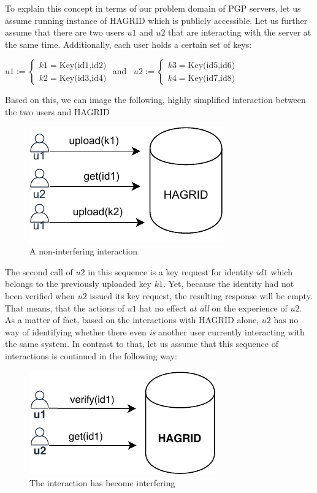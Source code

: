 To explain this concept in terms of our problem domain of PGP servers, let us assume running instance of HAGRID which is publicly accessible. Let us further assume that there are two users \(u1\) and \(u2\) that are interacting with the server at the same time. Additionally, each user holds a certain set of keys:


\(
    u1 := \begin{cases}
        k1 = \text{Key(id1,id2)} \\
        k2 = \text{Key(id3,id4)}
    \end{cases}
    \) and \, \(
    u2 := \begin{cases}
        k3 = \text{Key(id5,id6)} \\
        k4 = \text{Key(id7,id8)}
    \end{cases}
    \)

Based on this, we can image the following, highly simplified interaction between the two users and HAGRID
\begin{figure}[h]
    \label{fig:example}
    \centering
    \includegraphics{images/non_interference.pdf}
    \caption{A non-interfering interaction}
\end{figure}

The second call of \(u2\) in this sequence is a key request for identity \(id1\) which belongs to the previously uploaded key \(k1\). Yet, because the identity had not been verified when \(u2\) issued its key request, the resulting response will be empty. That means, that the actions of \(u1\) hat no effect \emph{at all} on the experience of \(u2\). 
As a matter of fact, based on the interactions with HAGRID alone, \(u2\) has no way of identifying whether there even \emph{is} another user currently interacting with the same system. 
In contrast to that, let us assume that this sequence of interactions is continued in the following way: 
\begin{figure}[h]
    \label{fig:example}
    \centering
    \includegraphics{images/interfering.pdf}
    \caption{The interaction has become interfering}
\end{figure}

